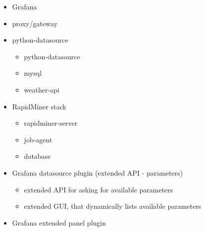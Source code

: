 \begin{itemize}
	\item Grafana
	\item proxy/gateway
	\item python-datasource
	\begin{itemize}
		\item python-datasource
		\item mysql
		\item weather-api
	\end{itemize}
	\item RapidMiner stack
	\begin{itemize}
		\item rapidminer-server
		\item job-agent
		\item database
	\end{itemize}
	\item Grafana datasource plugin (extended API - parameters)
	\begin{itemize}
		\item extended API for asking for available parameters
		\item extended GUI, that dynamically lists available parameters
	\end{itemize}
	\item Grafana extended panel plugin
\end{itemize}